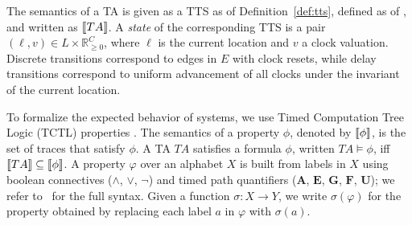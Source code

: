 The semantics of a TA is given as a TTS as of Definition~\ref{def:tts}, defined as of \cite{ALUR19932, Bouyer2005AnIT}, and written as $\llbracket TA \rrbracket$. A \emph{state} of the corresponding TTS is a pair $(\ell, v) \in L \times \mathbb{R}_{\geq 0}^C$, where $\ell$ is the current location and $v$ a clock valuation. %
Discrete transitions correspond to edges in $E$ with clock resets, while delay transitions correspond to uniform advancement of all clocks under the invariant of the current location.  

To formalize the expected behavior of systems, we use Timed Computation Tree Logic (TCTL) properties \cite{ALUR1994183}. The semantics of a property $\phi$, denoted by $\llbracket \phi \rrbracket$, is the set of traces that satisfy $\phi$. A TA $TA$ satisfies a formula $\phi$, written $TA \models \phi$, iff $\llbracket TA \rrbracket \subseteq \llbracket \phi \rrbracket$. 
A property $\varphi$ over an alphabet $X$ is built from labels in $X$ using boolean connectives ($\land$, $\lor$, $\neg$) and timed path quantifiers ($\mathbf{A}$, $\mathbf{E}$, $\mathbf{G}$, $\mathbf{F}$, $\mathbf{U}$); we refer to~\cite{ALUR1994183} for the full syntax. Given a function $\sigma : X \to Y$, we write $\sigma(\varphi)$ for the property obtained by replacing each label $a$ in $\varphi$ with $\sigma(a)$.
%


